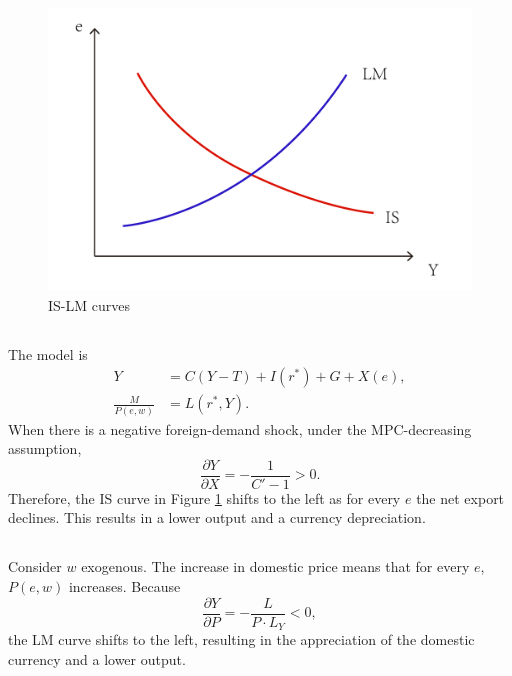 \documentclass{article}
\begin{document}
\subsection{}
\begin{figure}[h]
    \centering
    \includegraphics[scale=0.16]{Figure/figure.pdf}
    \caption{IS-LM curves}
    \label{fg1}
\end{figure}

\subsection{}
The model is
\begin{align*}
    Y &= C(Y - T) + I(r^\ast) + G + X(e), \\
    \frac{M}{P(e, w)} &= L(r^\ast, Y).
\end{align*}
When there is a negative foreign-demand shock, under the MPC-decreasing assumption,
\[
    \frac{\partial Y}{\partial X} =
    -\frac{1}{C' - 1} > 0.
\]
Therefore, the IS curve in Figure \ref{fg1} shifts to the left as for every $e$ the net export declines. This results in a lower output and a currency depreciation.

\subsection{}
Consider $w$ exogenous. The increase in domestic price means that for every $e$, $P(e, w)$ increases. Because
\[
    \frac{\partial Y}{\partial P} = - \frac{L}{P \cdot L_Y} < 0,
\]
the LM curve shifts to the left, resulting in the appreciation of the domestic currency and a lower output.
\end{document}
